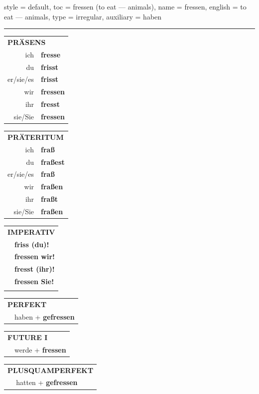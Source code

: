 \begin{verbentry}{
  style = {default},
  toc = {fressen (to eat — animals)},
  name = {fressen},
  english = {to eat — animals},
  type = {irregular},
  auxiliary = {haben}
}
 
    
     \vspace{5pt}

    \hrule
    
    \vspace{5pt}

  \begin{tabular}{rl}
     \multicolumn{2}{l}{\textbf{PRÄSENS} }\\
    ich & \textbf{fresse}\\
    du & \textbf{frisst}\\
    er/sie/es & \textbf{frisst}\\
    wir & \textbf{fressen}\\
    ihr & \textbf{fresst}\\
    sie/Sie & \textbf{fressen}\\
  \end{tabular}
  \hfill
     \begin{tabular}{rl}
    \multicolumn{2}{l}{\textbf{PRÄTERITUM} }\\
    ich & \textbf{fraß}\\
    du & \textbf{fraßest}\\
    er/sie/es & \textbf{fraß}\\
    wir & \textbf{fraßen}\\
    ihr & \textbf{fraßt}\\
    sie/Sie & \textbf{fraßen}\\
  \end{tabular}
  \hfill
  \begin{tabular}{rl}
     \multicolumn{2}{l}{\textbf{IMPERATIV} }\\
   & \textbf{friss (du)!}\\
   & \textbf{fressen wir!}\\
   & \textbf{fresst (ihr)!}\\
   & \textbf{fressen Sie!}\\
   & \vspace{10pt}
  \end{tabular}

    \vspace{10pt}

 \begin{tabular}{rl}
     \multicolumn{2}{l}{\textbf{PERFEKT}}\\
   & haben + \textbf{gefressen}\\
  \end{tabular}
\hfill
   \begin{tabular}{rl}
    \multicolumn{2}{l}{\textbf{FUTURE I} }\\
   & werde + \textbf{fressen}\\
  \end{tabular}
\hfill
   \begin{tabular}{rl}
      \multicolumn{2}{l}{\textbf{PLUSQUAMPERFEKT}}\\
   & hatten + \textbf{gefressen}\\
  \end{tabular}


\end{verbentry}
